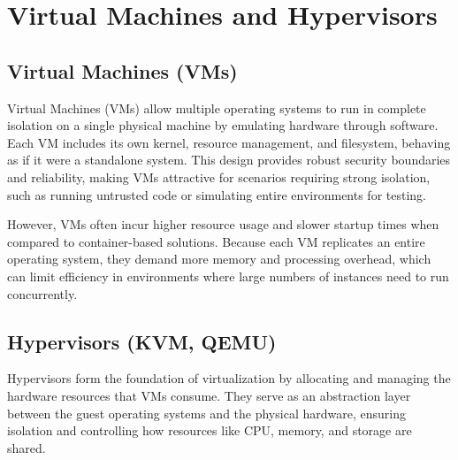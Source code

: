 \section{Virtual Machines and Hypervisors}

\subsection{Virtual Machines (VMs)}

Virtual Machines (VMs) allow multiple operating systems to run in complete isolation on a single physical machine by emulating hardware through software. Each VM includes its own kernel, resource management, and filesystem, behaving as if it were a standalone system. This design provides robust security boundaries and reliability, making VMs attractive for scenarios requiring strong isolation, such as running untrusted code or simulating entire environments for testing.

However, VMs often incur higher resource usage and slower startup times when compared to container-based solutions. Because each VM replicates an entire operating system, they demand more memory and processing overhead, which can limit efficiency in environments where large numbers of instances need to run concurrently.


\subsection{Hypervisors (KVM, QEMU)}

Hypervisors form the foundation of virtualization by allocating and managing the hardware resources that VMs consume. They serve as an abstraction layer between the guest operating systems and the physical hardware, ensuring isolation and controlling how resources like CPU, memory, and storage are shared.


